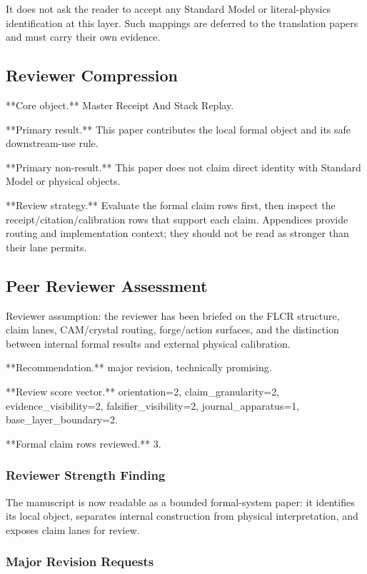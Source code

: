 \documentclass[11pt]{article}
\begin{document}
It does not ask the reader to accept any Standard Model or literal-physics identification at this layer. Such mappings are deferred to the translation papers and must carry their own evidence.

\subsection*{Reviewer Compression}

**Core object.** Master Receipt And Stack Replay.

**Primary result.** This paper contributes the local formal object and its safe downstream-use rule.

**Primary non-result.** This paper does not claim direct identity with Standard Model or physical objects.

**Review strategy.** Evaluate the formal claim rows first, then inspect the receipt/citation/calibration rows that support each claim. Appendices provide routing and implementation context; they should not be read as stronger than their lane permits.

\subsection*{Peer Reviewer Assessment}

Reviewer assumption: the reviewer has been briefed on the FLCR structure, claim lanes, CAM/crystal routing, forge/action surfaces, and the distinction between internal formal results and external physical calibration.

**Recommendation.** major revision, technically promising.

**Review score vector.** orientation=2, claim\_granularity=2, evidence\_visibility=2, falsifier\_visibility=2, journal\_apparatus=1, base\_layer\_boundary=2.

**Formal claim rows reviewed.** 3.

\subsubsection*{Reviewer Strength Finding}

The manuscript is now readable as a bounded formal-system paper: it identifies its local object, separates internal construction from physical interpretation, and exposes claim lanes for review.

\subsubsection*{Major Revision Requests}
\end{document}
